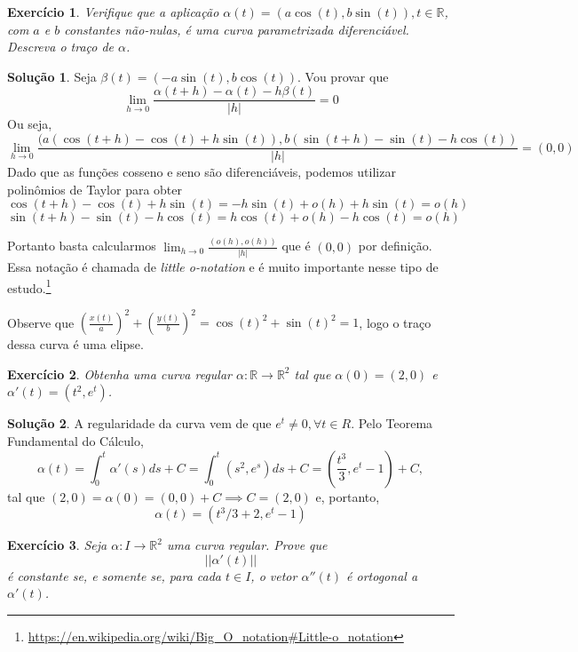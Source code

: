 \documentclass[a4paper,12pt]{article}
\newcommand{\R}{\mathbb{R}}
\theoremstyle{exer}
\newtheorem{exercise}{Exercício}
\theoremstyle{definition}
\newtheorem{solution}{Solução}
\theoremstyle{plain}
\begin{document}
\begin{exercise}
    Verifique que a aplicação $\alpha(t) = (a\cos(t), b\sin(t)), t \in \R$, com $a$ e $b$ constantes não-nulas, é uma curva parametrizada diferenciável. Descreva o traço de $\alpha$.
\end{exercise}

\begin{solution}
    Seja $\beta(t) = (-a\sin(t), b\cos(t))$. Vou provar que 
    $$
    \lim_{h\to 0} \frac{\alpha(t+h) - \alpha(t) -  h\beta(t)}{|h|} = 0 
    $$
    Ou seja,
    $$
    \lim_{h\to 0} \frac{(a(\cos(t + h) - \cos(t) + h\sin(t)), b(\sin(t+h) - \sin(t) - h\cos(t))}{|h|} = (0,0) 
    $$ 
    Dado que as funções cosseno e seno são diferenciáveis, podemos utilizar
    polinômios de Taylor para obter
    $$
    \cos(t + h) - \cos(t) + h\sin(t) = -h\sin(t) + o(h) + h\sin(t) = o(h)
    $$
    $$
    \sin(t+h) - \sin(t) - h\cos(t) = h\cos(t) + o(h) - h\cos(t) = o(h)
    $$

    Portanto basta calcularmos $\lim_{h\to 0}\frac{(o(h),
    o(h))}{|h|}$ que é $(0,0)$ por definição. Essa notação é chamada de {\it
    little o-notation} e é muito importante nesse tipo de estudo.\footnote{\url{https://en.wikipedia.org/wiki/Big_O_notation\#Little-o_notation}}

    Observe que $\left(\frac{x(t)}{a}\right)^2 + \left(\frac{y(t)}{b}\right)^2
    = \cos(t)^2 + \sin(t)^2 = 1$, logo o traço dessa curva é uma elipse. 
\end{solution}

\begin{exercise}
    Obtenha uma curva regular $\alpha : \R \to \R^2$ tal que $\alpha(0) = (2, 0)$ e $\alpha'(t) = (t^2 , e^t )$.    
\end{exercise}

\begin{solution}
    A regularidade da curva vem de que $e^t \neq 0, \forall t \in R$. Pelo
    Teorema Fundamental do Cálculo, 
    $$
    \alpha(t) = \int_0^t \alpha '(s) ds + C = \int_0^t (s^2, e^s)ds + C = \left(\frac{t^3}{3}, e^t - 1\right) + C, 
    $$
    tal que $(2, 0) = \alpha(0) = (0, 0) + C \implies C = (2,0)$ e, portanto, 
    $$
    \alpha(t) = (t^3/3 + 2, e^t - 1)
    $$
\end{solution}

\begin{exercise}
    Seja $\alpha : I \to \R^2$ uma curva regular. Prove que $$||\alpha'(t)||$$ é constante se, e somente se,
    para cada $t \in I$, o vetor $\alpha ''(t)$ é ortogonal a $\alpha '(t)$.    
\end{exercise}
\end{document}
